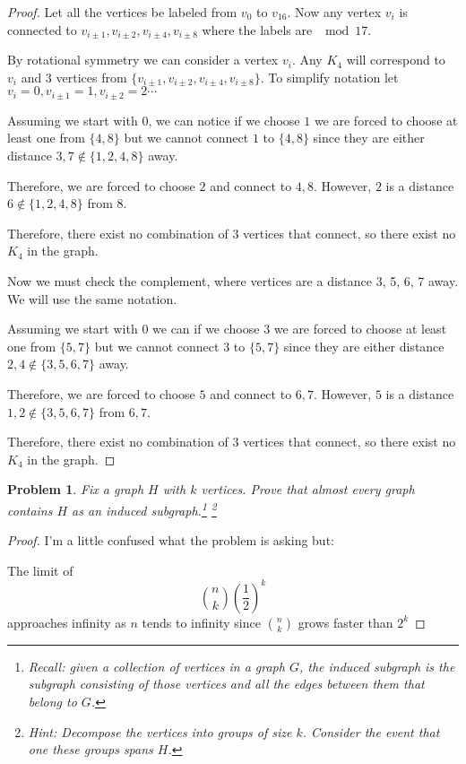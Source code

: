 \documentclass[11pt]{article}
\newtheorem{problem}{Problem}
\begin{document}
\begin{proof}
Let all the vertices be labeled from \(v_0\) to \(v_16\). Now any vertex \(v_i\) is connected to \(v_{i \pm 1}, v_{i \pm 2}, v_{i \pm 4}, v_{i \pm 8}\) where the labels are \(\mod 17\). 

By rotational symmetry we can consider a vertex \(v_i\). Any \(K_4\) will correspond to \(v_i\) and 3 vertices from \(\{v_{i \pm 1}, v_{i \pm 2}, v_{i \pm 4}, v_{i \pm 8}\}\). To simplify notation let \(v_i = 0, v_{i \pm 1} = 1, v_{i \pm 2} = 2 \cdots\) 

Assuming we start with \(0\), we can notice if we choose \(1\) we are forced to choose at least one from \(\{4, 8\}\) but we cannot connect \(1\) to \(\{4, 8\}\) since they are either distance \(3, 7 \not\in \{1, 2, 4, 8\}\) away.  

Therefore, we are forced to choose \(2\) and connect to \(4, 8\). However, \(2\) is a distance \(6 \not\in \{1, 2, 4, 8\}\) from \(8\).

Therefore, there exist no combination of 3 vertices that connect, so there exist no \(K_4\) in the graph.


Now we must check the complement, where vertices are a  distance 3, 5, 6, 7 away. We will use the same notation.

Assuming we start with \(0\) we can if we choose \(3\) we are forced to choose at least one from \(\{5, 7\}\) but we cannot connect \(3\) to \(\{5, 7\}\) since they are either distance \(2, 4 \not\in \{3,5,6,7\}\) away.  

Therefore, we are forced to choose \(5\) and connect to \(6, 7\). However, \(5\) is a distance \(1, 2 \not\in \{3,5,6,7\}\) from \(6, 7\).

Therefore, there exist no combination of 3 vertices that connect, so there exist no \(K_4\) in the graph.
\end{proof}

\pagebreak

\begin{problem}
Fix a graph $H$ with $k$ vertices. Prove that almost every graph contains $H$ as an induced subgraph.\footnote{Recall: given a collection of vertices in a graph $G$, the induced subgraph is the subgraph consisting of those vertices and all the edges between them that belong to $G$.} \footnote{Hint: Decompose the vertices into groups of size $k$. Consider the event that one these groups spans $H$.}
\end{problem}

\begin{proof}
I'm a little confused what the problem is asking but:

The limit of 
\[
	{n \choose k} (\frac{1}{2})^k
\]
approaches infinity as \(n\) tends to infinity since \({n \choose k}\) grows faster than \(2^{{k}}\) 
\end{proof}
\end{document}
